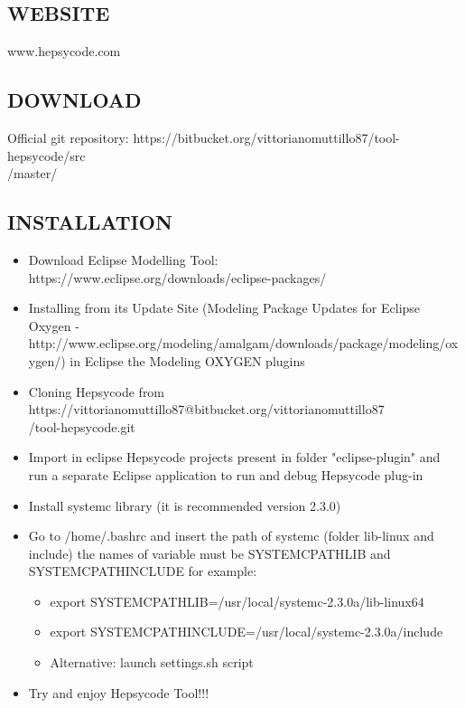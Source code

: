 \begin{appendices}
\subsection{WEBSITE}
%
www.hepsycode.com
%
\subsection{DOWNLOAD}
%
Official git repository: https://bitbucket.org/vittorianomuttillo87/tool-hepsycode/src \\ /master/
%
\subsection{INSTALLATION}
%
\begin{itemize}
    \item Download Eclipse Modelling Tool: https://www.eclipse.org/downloads/eclipse-packages/
    \item Installing from its Update Site (Modeling Package Updates for Eclipse Oxygen - http://www.eclipse.org/modeling/amalgam/downloads/package/modeling/oxygen/) in Eclipse the Modeling OXYGEN plugins
    \item Cloning Hepsycode from https://vittorianomuttillo87@bitbucket.org/vittorianomuttillo87 \\ /tool-hepsycode.git
    \item Import in eclipse Hepsycode projects present in folder "eclipse-plugin" and run a separate Eclipse application to run and debug Hepsycode plug-in
    \item Install systemc library (it is recommended version 2.3.0)
    \item Go to /home/.bashrc and insert the path of systemc (folder lib-linux and include) the names of variable must be SYSTEMCPATHLIB and SYSTEMCPATHINCLUDE for example:
    \begin{itemize}
        \item export SYSTEMCPATHLIB=/usr/local/systemc-2.3.0a/lib-linux64
        \item export SYSTEMCPATHINCLUDE=/usr/local/systemc-2.3.0a/include
        \item Alternative: launch settings.sh script
    \end{itemize}
    \item Try and enjoy Hepsycode Tool!!!
\end{itemize}
%

\end{appendices}
